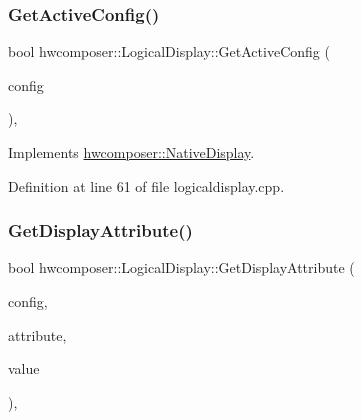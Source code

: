 \subsubsection{\texorpdfstring{Get\+Active\+Config()}{GetActiveConfig()}}
{\footnotesize\ttfamily bool hwcomposer\+::\+Logical\+Display\+::\+Get\+Active\+Config (\begin{DoxyParamCaption}\item[{uint32\+\_\+t $\ast$}]{config }\end{DoxyParamCaption})\hspace{0.3cm}{\ttfamily [override]}, {\ttfamily [virtual]}}



Implements \mbox{\hyperlink{classhwcomposer_1_1NativeDisplay_a9d4d9d2f6633fe37025210cac6e8cc6c}{hwcomposer\+::\+Native\+Display}}.



Definition at line 61 of file logicaldisplay.\+cpp.


\begin{DoxyCode}{0}
\end{DoxyCode}
\mbox{\label{classhwcomposer_1_1LogicalDisplay_a0ccbb1903cf15c1459f491aa1d3b3619}} 
\subsubsection{\texorpdfstring{Get\+Display\+Attribute()}{GetDisplayAttribute()}}
{\footnotesize\ttfamily bool hwcomposer\+::\+Logical\+Display\+::\+Get\+Display\+Attribute (\begin{DoxyParamCaption}\item[{uint32\+\_\+t}]{config,  }\item[{H\+W\+C\+Display\+Attribute}]{attribute,  }\item[{int32\+\_\+t $\ast$}]{value }\end{DoxyParamCaption})\hspace{0.3cm}{\ttfamily [override]}, {\ttfamily [virtual]}}



